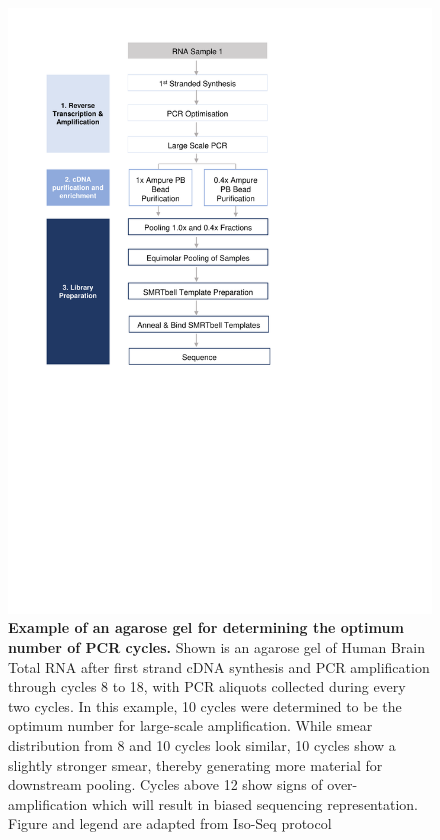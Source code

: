 \begin{figure}[htp]
	\begin{center}
		\includegraphics[page=13,trim={1cm 24cm 10cm 1cm},clip,scale = 0.9]{Figures/ProjectDevelopment_Figures.pdf}
	\end{center}
	\captionsetup{width=0.95\textwidth}
	\caption[Example of an agarose gel for determining the optimum number of PCR cycles]%
	{\textbf{Example of an agarose gel for determining the optimum number of PCR cycles.} Shown is an agarose gel of Human Brain Total RNA after first strand cDNA synthesis and PCR amplification through cycles 8 to 18, with PCR aliquots collected during every two cycles. In this example, 10 cycles were determined to be the optimum number for large-scale amplification. While smear distribution from 8 and 10 cycles look similar, 10 cycles show a slightly stronger smear, thereby generating more material for downstream pooling. Cycles above 12 show signs of over-amplification which will result in biased sequencing representation. Figure and legend are adapted from Iso-Seq protocol}
	\label{fig:pcr_optimisation_gel_eg}
\end{figure}



